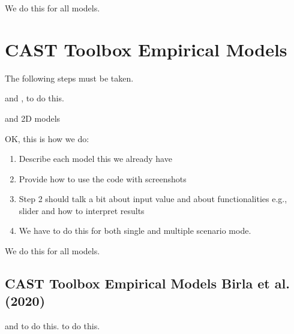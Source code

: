 \documentclass[letterpaper,10pt,english]{sphinxmanual}
\begin{document}
\sphinxAtStartPar
We do this for all models.


\chapter{CAST Toolbox \sphinxhyphen{} Empirical Models}
\label{\detokenize{contents/toolbox/em_model/em_model:cast-toolbox-empirical-models}}\label{\detokenize{contents/toolbox/em_model/em_model::doc}}
\sphinxAtStartPar
The following steps must be taken.

\sphinxAtStartPar
{} and , to do this.

\sphinxAtStartPar
{} and  \sphinxhyphen{} 2D models

\sphinxAtStartPar
OK, this is how we do:
\begin{enumerate}
%
\item {} 
\sphinxAtStartPar
Describe each model \sphinxhyphen{} this we already have

\item {} 
\sphinxAtStartPar
Provide how to use the code with screenshots

\item {} 
\sphinxAtStartPar
Step 2 should talk a bit about input value and about functionalities \sphinxhyphen{} e.g., slider and how to interpret results

\item {} 
\sphinxAtStartPar
We have to do this for both single and multiple scenario mode.

\end{enumerate}

\sphinxAtStartPar
We do this for all models.


\section{CAST Toolbox \sphinxhyphen{} Empirical Models \sphinxhyphen{} Birla et al. (2020)}
\label{\detokenize{contents/toolbox/em_model/birla2020:cast-toolbox-empirical-models-birla-et-al-2020}}\label{\detokenize{contents/toolbox/em_model/birla2020::doc}}
\sphinxAtStartPar
{} and  to do this. to do this.
\end{document}
